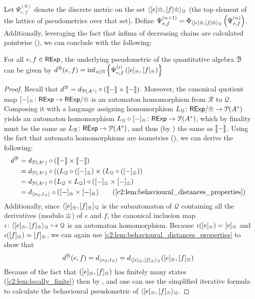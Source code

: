 Let ${\Psi}_{e,f}^{(0)}$ denote the discrete metric on the set $\langle [e]{{\mathrel{\dot\equiv}}},[f]{{\mathrel{\dot\equiv}}} \rangle_{\mathcal{Q}}$ (the top element of the lattice of pseudometrics over that set). Define ${\Psi}_{e,f}^{(n+1)} = \Phi_{\langle [e]{{\mathrel{\dot\equiv}}},[f]{{\mathrel{\dot\equiv}}} \rangle_{\mathcal{Q}}} \left({\Psi}_{e,f}^{(n)}\right)$. Additionally, leveraging the fact that infima of decreasing chains are calculated pointwise (), we can conclude with the following:
\begin{lemma}\label{c2:lem:iterative_calculation}
For all $e,f \in \mathsf{RExp}$, the underlying pseudometric of the quantitative algebra $\mathcal{B}$ can be given by $d^{\mathcal{B}}(e,f) = \inf_{i \in \mathbb{N}} \left\{ {\Psi}_{e,f}^{(i)}\left([e]_{{\mathrel{\dot\equiv}}}, [f]_{{\mathrel{\dot\equiv}}}\right)\right\} $
\end{lemma}
\begin{proof}
    Recall that $d^{\mathcal{B}} = d_{\mathcal{P}({A}^{\ast})} \circ (\left\llbracket{-}\right\rrbracket \times \left\llbracket{-}\right\rrbracket)$. Moreover, the canonical quotient map $[-]_{{\mathrel{\dot\equiv}}} \colon \mathsf{RExp} \to {\mathsf{RExp}}/{{\mathrel{\dot\equiv}}}$ is an automaton homomorphism from $\mathcal{R}$ to $\mathcal{Q}$. Composing it with a language assigning homomorphism $L_{\mathcal{Q}} \colon {\mathsf{RExp}}/{{\mathrel{\dot\equiv}}} \to \mathcal{P}({A}^\ast)$ yields an automaton homomorphism $L_{\mathcal{Q}} \circ [-]_{{\mathrel{\dot\equiv}}} \colon \mathsf{RExp} \to \mathcal{P}({A}^\ast)$, which by finality must be the same as $L_{\mathcal{R}} \colon \mathsf{RExp} \to \mathcal{P}({A}^\ast)$, and thus (by ) the same as $\left\llbracket{-}\right\rrbracket$. Using the fact that automata homomorphisms are isometries (), we can derive the following:
    \begin{align*}
    d^{\qalgB} &= \langmetric \circ (\sem{-} \times \sem{-})\\
    &= \langmetric \circ ((L_{\mathcal{Q}} \circ ([-]_{\acirel}) \times (L_{\mathcal{Q}} \circ ([-]_{\acirel}))\\
    &= \langmetric \circ (L_{\mathcal{Q}} \times L_{\mathcal{Q}}) \circ ([-]_{\acirel} \times [-]_{\acirel})\\
    &= d_{\langle o_{\mathcal{Q}}, t_{\mathcal{Q}} \rangle} \circ ([-]_{\acirel} \times [-]_{\acirel}) \tag{\Cref{c2:lem:behavioural_distances_properties}}
    \end{align*}
    Additionally, since $\langle [e]_{{\mathrel{\dot\equiv}}},[f]_{{\mathrel{\dot\equiv}}} \rangle_{\mathcal{Q}}$ is the subautomaton of $\mathcal{Q}$ containing all the derivatives (modulo ${\mathrel{\dot\equiv}}$) of $e$ and $f$, the canonical inclusion map $\iota \colon \langle [e]_{{\mathrel{\dot\equiv}}},[f]_{{\mathrel{\dot\equiv}}} \rangle_{\mathcal{Q}} \hookrightarrow \mathcal{Q}$ is an automaton homomorphism. Because $\iota([e]_{{\mathrel{\dot\equiv}}})=[e]_{{\mathrel{\dot\equiv}}}$ and $\iota([f]_{{\mathrel{\dot\equiv}}})=[f]_{{\mathrel{\dot\equiv}}}$, we can again use \cref{c2:lem:behavioural_distances_properties} to show that
    $$
    d^{\mathcal{B}}(e,f) = d_{\langle o_{\mathcal{Q}}, t_{\mathcal{Q}} \rangle} = d_{\langle [e]_{{\mathrel{\dot\equiv}}},[f]_{{\mathrel{\dot\equiv}}} \rangle_{\mathcal{Q}}}([e]_{{\mathrel{\dot\equiv}}}, [f]_{{\mathrel{\dot\equiv}}})
    $$
    Because of the fact that $([e]_{{\mathrel{\dot\equiv}}}, [f]_{{\mathrel{\dot\equiv}}})$ has finitely many states (\cref{c2:lem:locally_finite}) then by ,  and  one can use the simplified iterative formula to calculate the behavioural pseudometric of $\langle [e]_{{\mathrel{\dot\equiv}}},[f]_{{\mathrel{\dot\equiv}}} \rangle_{\mathcal{Q}}$.
\end{proof}


